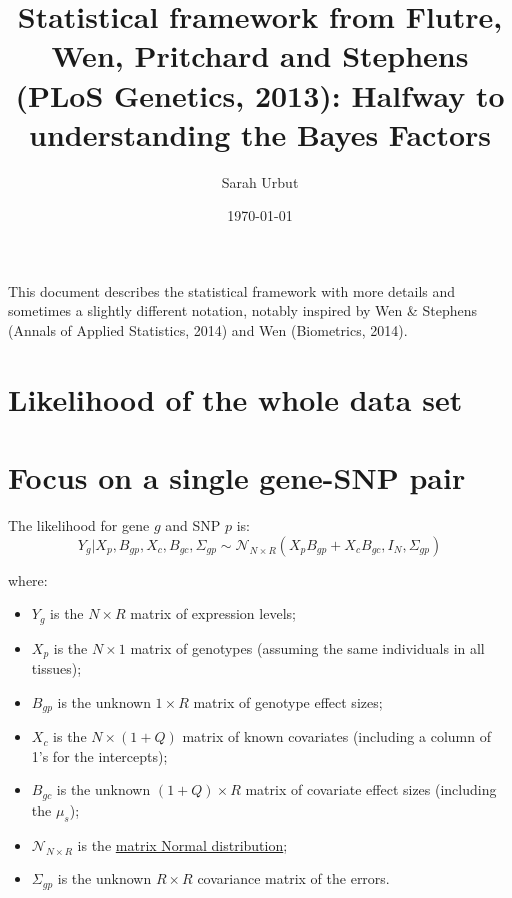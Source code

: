 \documentclass[10pt]{article}
\newcommand{\Norm}{{\mathcal{N}}} %
\begin{document}
\title{Statistical framework from Flutre, Wen, Pritchard and Stephens (PLoS Genetics, 2013): Halfway to understanding the Bayes Factors}
\author{Sarah Urbut}
\date{\today}

\maketitle

\tableofcontents

\vspace{1cm}

This document describes the statistical framework with more details and sometimes a slightly different notation, notably inspired by Wen \& Stephens (Annals of Applied Statistics, 2014) and Wen (Biometrics, 2014).



\section{Likelihood of the whole data set}

\section{Focus on a single gene-SNP pair}

The likelihood for gene $g$ and SNP $p$ is:
\begin{equation}
Y_g | X_p, B_{gp}, X_c, B_{gc}, \Sigma_{gp} \sim \Norm_{N \times R}(X_p B_{gp} + X_c B_{gc}, I_N, \Sigma_{gp})
\end{equation}

where:
\begin{itemize}
\item $Y_g$ is the $N \times R$ matrix of expression levels;
\item $X_p$ is the $N \times 1$ matrix of genotypes (assuming the same individuals in all tissues);
\item $B_{gp}$ is the unknown $1 \times R$ matrix of genotype effect sizes;
\item $X_c$ is the $N \times (1+Q)$ matrix of known covariates (including a column of 1's for the intercepts);
\item $B_{gc}$ is the unknown $(1+Q) \times R$ matrix of covariate effect sizes (including the $\mu_s$);
\item $\Norm_{N \times R}$ is the \href{https://en.wikipedia.org/wiki/Matrix_normal_distribution}{matrix Normal distribution};
\item $\Sigma_{gp}$ is the unknown $R \times R$ covariance matrix of the errors.
\end{itemize}
\end{document}
